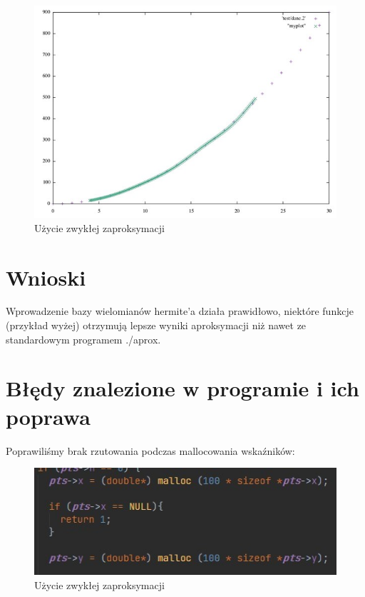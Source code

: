\documentclass[10pt, a4paper]{report}
\begin{document}
    \begin{figure}[h]
        \begin{center}
            \includegraphics[scale=0.6]{compare2.jpg}
            \caption{Użycie zwykłej zaproksymacji}
        \end{center}
    \end{figure}
    \newpage

    \section{Wnioski}
    Wprowadzenie bazy wielomianów hermite’a działa prawidłowo, niektóre funkcje (przykład wyżej) otrzymują lepsze wyniki aproksymacji niż nawet ze standardowym programem ./aprox.

    \section{Błędy znalezione w programie i ich poprawa}
    Poprawiliśmy brak rzutowania podczas mallocowania wskaźników:
    \begin{figure}[h]
        \begin{center}
            \includegraphics[scale=0.7]{error1.jpg}
            \caption{Użycie zwykłej zaproksymacji}
        \end{center}
    \end{figure}
    
\end{document}
